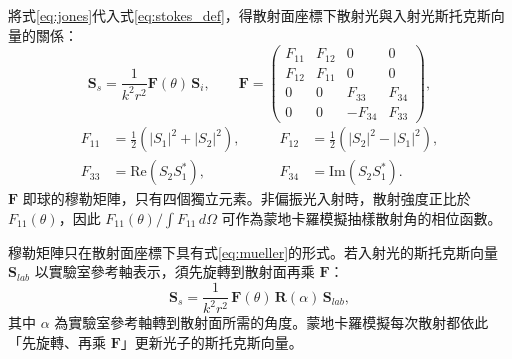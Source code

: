 將式\eqref{eq:jones}代入式\eqref{eq:stokes_def}，得散射面座標下散射光與入射光斯托克斯向量的關係：
\begin{equation}
    \mathbf{S}_s = \frac{1}{k^2 r^2} \mathbf{F}(\theta)\, \mathbf{S}_i, \qquad \mathbf{F} = \begin{pmatrix} F_{11} & F_{12} & 0 & 0 \\ F_{12} & F_{11} & 0 & 0 \\ 0 & 0 & F_{33} & F_{34} \\ 0 & 0 & -F_{34} & F_{33} \end{pmatrix} , \label{eq:mueller}
\end{equation}
\begin{equation}
    \begin{aligned}
        F_{11} &= \tfrac{1}{2}\left( |S_1|^2 + |S_2|^2 \right), \qquad & F_{12} &= \tfrac{1}{2}\left( |S_2|^2 - |S_1|^2 \right), \\
        F_{33} &= \mathrm{Re}\left( S_2 S_1^* \right), \qquad & F_{34} &= \mathrm{Im}\left( S_2 S_1^* \right) .
    \end{aligned}
\end{equation}
$\mathbf{F}$ 即球的穆勒矩陣，只有四個獨立元素。非偏振光入射時，散射強度正比於 $F_{11}(\theta)$，因此 $F_{11}(\theta)/\int F_{11}\,d\Omega$ 可作為蒙地卡羅模擬抽樣散射角的相位函數。

穆勒矩陣只在散射面座標下具有式\eqref{eq:mueller}的形式。若入射光的斯托克斯向量 $\mathbf{S}_{lab}$ 以實驗室參考軸表示，須先旋轉到散射面再乘 $\mathbf{F}$：
\begin{equation}
    \mathbf{S}_s = \frac{1}{k^2 r^2}\, \mathbf{F}(\theta)\, \mathbf{R}(\alpha)\, \mathbf{S}_{lab} ,
\end{equation}
其中 $\alpha$ 為實驗室參考軸轉到散射面所需的角度。蒙地卡羅模擬每次散射都依此「先旋轉、再乘 $\mathbf{F}$」更新光子的斯托克斯向量。
